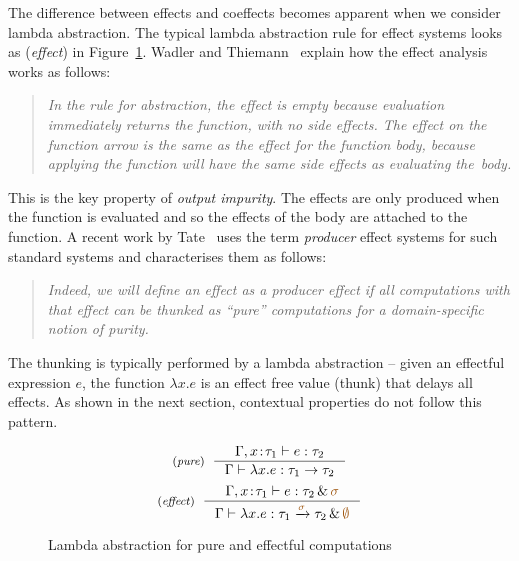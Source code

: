 The difference between effects and coeffects becomes apparent when we consider lambda abstraction.
The typical lambda abstraction rule for effect systems looks as (\emph{effect}) in 
Figure~\ref{fig:applications-abs}. Wadler and Thiemann~\cite{monads-effects-marriage} explain how 
the effect analysis works as follows:
%
\begin{quote}
\emph{In the rule for abstraction, the effect is empty because evaluation immediately
returns the function, with no side effects. The effect on the function arrow
is the same as the effect for the function body, because applying the function will
have the same side effects as evaluating the~body.}
\end{quote}
%
This is the key property of \emph{output impurity}. The effects are only produced when the
function is evaluated and so the effects of the body are attached to the function. A recent
work by Tate~\cite{effects-producer-semantics} uses the term \emph{producer} effect systems
for such standard systems and characterises them as follows:
%
\begin{quote}
\emph{Indeed, we will define an effect as a producer effect if all computations with that 
effect can be thunked as ``pure'' computations for a domain-specific notion of purity.}
\end{quote} 
%
The thunking is typically performed by a lambda abstraction -- given an effectful expression 
$e$, the function $\lambda x.e$ is an effect free value (thunk) that delays all effects.
As shown in the next section, contextual properties do not follow this pattern.


\begin{figure}
\begin{equation*}
\tyrule{pure}
  { \Gamma, x\!:\!\tau_1 \vdash e : \tau_2}
  { \Gamma \vdash \lambda x.e : \tau_1 \rightarrow \tau_2}
\end{equation*}
\begin{equation*}
\tyrule{effect}
  { \Gamma, x\!:\!\tau_1 \vdash e : \tau_2 \,\&\, \aclrd{\sigma} }
  { \Gamma \vdash \lambda x.e : \tau_1 \xrightarrow{\aclrd{\sigma}} \tau_2 \,\&\, \aclrd{\emptyset} }
\end{equation*}
\caption{Lambda abstraction for pure and effectful computations}
\label{fig:applications-abs}
\end{figure}



